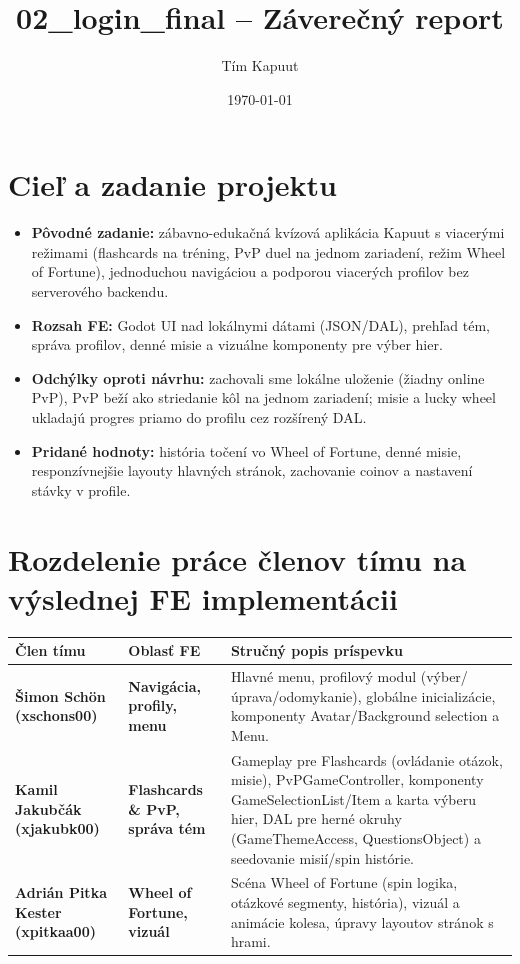 \documentclass[12pt,a4paper]{article}
\title{02\_login\_final -- Záverečný report}
\author{Tím Kapuut}
\date{\today}
\begin{document}
\maketitle

\section{Cieľ a zadanie projektu}
\begin{itemize}
    \item \textbf{Pôvodné zadanie:} zábavno-edukačná kvízová aplikácia Kapuut s viacerými režimami (flashcards na tréning, PvP duel na jednom zariadení, režim Wheel of Fortune), jednoduchou navigáciou a podporou viacerých profilov bez serverového backendu.
    \item \textbf{Rozsah FE:} Godot UI nad lokálnymi dátami (JSON/DAL), prehľad tém, správa profilov, denné misie a vizuálne komponenty pre výber hier.
    \item \textbf{Odchýlky oproti návrhu:} zachovali sme lokálne uloženie (žiadny online PvP), PvP beží ako striedanie kôl na jednom zariadení; misie a lucky wheel ukladajú progres priamo do profilu cez rozšírený DAL.
    \item \textbf{Pridané hodnoty:} história točení vo Wheel of Fortune, denné misie, responzívnejšie layouty hlavných stránok, zachovanie coinov a nastavení stávky v profile.
\end{itemize}

\section{Rozdelenie práce členov tímu na výslednej FE implementácii}
\begin{tabularx}{\textwidth}{|>{\bfseries}l|>{\bfseries}l|X|}
    \hline
    Člen tímu & Oblasť FE & Stručný popis príspevku \\
    \hline
    Šimon Schön (xschons00) & Navigácia, profily, menu & Hlavné menu, profilový modul (výber/úprava/odomykanie), globálne inicializácie, komponenty Avatar/Background selection a Menu. \\
    \hline
    Kamil Jakubčák (xjakubk00) & Flashcards \& PvP, správa tém & Gameplay pre Flashcards (ovládanie otázok, misie), PvPGameController, komponenty GameSelectionList/Item a karta výberu hier, DAL pre herné okruhy (GameThemeAccess, QuestionsObject) a seedovanie misií/spin histórie. \\
    \hline
    Adrián Pitka Kester (xpitkaa00) & Wheel of Fortune, vizuál & Scéna Wheel of Fortune (spin logika, otázkové segmenty, história), vizuál a animácie kolesa, úpravy layoutov stránok s hrami. \\
    \hline
\end{tabularx}
\end{document}
